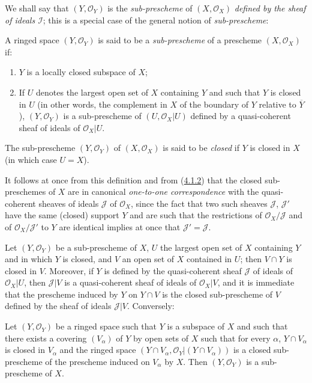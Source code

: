 We shall say that $(Y,\mathscr{O}_Y)$ is the \emph{sub-prescheme} of
$(X,\mathscr{O}_X)$ \emph{defined by the sheaf of ideals $\mathscr{I}$};
this is a special case of the general notion of \emph{sub-prescheme}:

\begin{definition}[4.1.3]
\label{I.4.1.3}
A ringed space $(Y,\mathscr{O}_Y)$ is said to be a
\emph{sub-prescheme} of a prescheme $(X,\mathscr{O}_X)$ if:
\begin{enumerate}
  \item[$1^\circ$] $Y$ is a locally closed subspace of $X$;
  \item[$2^\circ$] If $U$ denotes the largest open set of $X$ containing $Y$
  and such that $Y$ is closed in $U$ (in other words, the complement in
  $X$ of the boundary of $Y$ relative to $\overline{Y}$),
  $(Y,\mathscr{O}_Y)$ is a sub-prescheme of
  $(U,\mathscr{O}_X|U)$ defined by a quasi-coherent sheaf of ideals of
  $\mathscr{O}_X|U$.
\end{enumerate}
The sub-prescheme $(Y,\mathscr{O}_Y)$ of $(X,\mathscr{O}_X)$ is said to be
\emph{closed} if $Y$ is closed in $X$ (in which case $U=X$).
\end{definition}

It follows at once from this definition and from
(\hyperref[I.4.1.2]{4.1.2}) that the closed sub-preschemes of $X$ are in
canonical \emph{one-to-one correspondence} with the quasi-coherent sheaves of
ideals $\mathscr{J}$ of $\mathscr{O}_X$, since the fact that two such
sheaves $\mathscr{J}$, $\mathscr{J}'$ have the same (closed) support $Y$ and
are such that the restrictions of $\mathscr{O}_X/\mathscr{J}$ and of
$\mathscr{O}_X/\mathscr{J}'$ to $Y$ are identical implies at once that
$\mathscr{J}'=\mathscr{J}$.

\begin{env}[4.1.4]
\label{I.4.1.4}
Let $(Y,\mathscr{O}_Y)$ be a sub-prescheme of $X$, $U$ the largest open set
of $X$ containing $Y$ and in which $Y$ is closed, and $V$ an open set of $X$
contained in $U$; then $V\cap Y$ is closed in $V$. Moreover, if $Y$ is
defined by the quasi-coherent sheaf $\mathscr{J}$ of ideals of
$\mathscr{O}_X|U$, then $\mathscr{J}|V$ is a quasi-coherent sheaf of ideals of
$\mathscr{O}_X|V$, and it is immediate that the prescheme induced by $Y$ on
$Y\cap V$ is the closed sub-prescheme of $V$ defined by the sheaf of ideals
$\mathscr{J}|V$. Conversely:
\end{env}

\begin{proposition}[4.1.5]
\label{I.4.1.5}
Let $(Y,\mathscr{O}_Y)$ be a ringed space such that $Y$ is a subspace of
$X$ and such that there exists a covering $(V_\alpha)$ of $Y$ by open sets of
$X$ such that for every $\alpha$, $Y\cap V_\alpha$ is closed in $V_\alpha$
and the ringed space
$(Y\cap V_\alpha,\mathscr{O}_Y|(Y\cap V_\alpha))$ is a closed
sub-prescheme of the prescheme induced on $V_\alpha$ by $X$. Then
$(Y,\mathscr{O}_Y)$ is a sub-prescheme of $X$.
\end{proposition}

